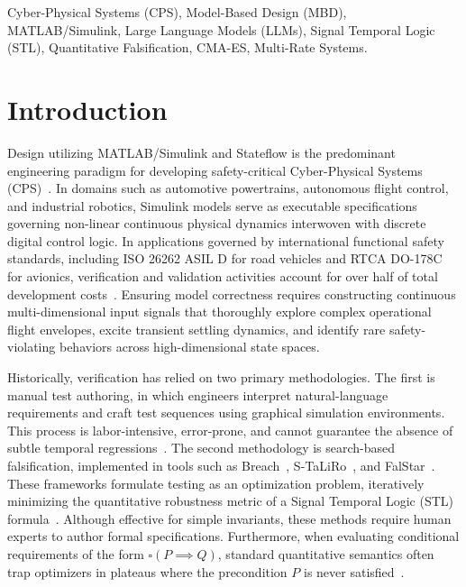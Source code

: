 \documentclass[journal]{IEEEtran}
\begin{document}
\begin{IEEEkeywords}
Cyber-Physical Systems (CPS), Model-Based Design (MBD), MATLAB/Simulink, Large Language Models (LLMs), Signal Temporal Logic (STL), Quantitative Falsification, CMA-ES, Multi-Rate Systems.
\end{IEEEkeywords}

\section{Introduction}
 Design utilizing MATLAB/Simulink and Stateflow is the predominant engineering paradigm for developing safety-critical Cyber-Physical Systems (CPS)~\cite{broy2012benefit}. In domains such as automotive powertrains, autonomous flight control, and industrial robotics, Simulink models serve as executable specifications governing non-linear continuous physical dynamics interwoven with discrete digital control logic. In applications governed by international functional safety standards, including ISO 26262 ASIL D for road vehicles and RTCA DO-178C for avionics, verification and validation activities account for over half of total development costs~\cite{liggesmeyer2009trends,baleani2006correct}. Ensuring model correctness requires constructing continuous multi-dimensional input signals that thoroughly explore complex operational flight envelopes, excite transient settling dynamics, and identify rare safety-violating behaviors across high-dimensional state spaces.

Historically, verification has relied on two primary methodologies. The first is manual test authoring, in which engineers interpret natural-language requirements and craft test sequences using graphical simulation environments. This process is labor-intensive, error-prone, and cannot guarantee the absence of subtle temporal regressions~\cite{giannakopoulou2020formal}. The second methodology is search-based falsification, implemented in tools such as Breach~\cite{donze2010breach}, S-TaLiRo~\cite{annpureddy2011staliro}, and FalStar~\cite{ernst2021falstar}. These frameworks formulate testing as an optimization problem, iteratively minimizing the quantitative robustness metric of a Signal Temporal Logic (STL) formula~\cite{maler2004monitoring,fainekos2009robustness}. Although effective for simple invariants, these methods require human experts to author formal specifications. Furthermore, when evaluating conditional requirements of the form $\square(P \implies Q)$, standard quantitative semantics often trap optimizers in plateaus where the precondition $P$ is never satisfied~\cite{dokhanchi2018vacuity,ferrere2019vacuity}.
\end{document}
